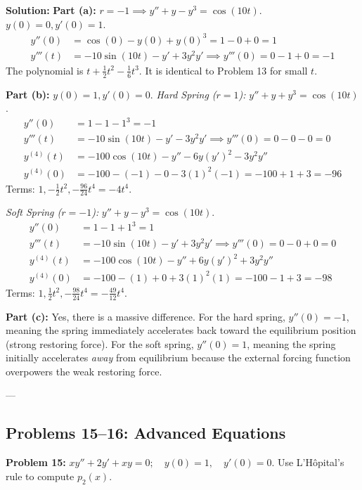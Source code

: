 \documentclass[11pt, letterpaper]{article}
\theoremstyle{definition}
\theoremstyle{remark}
\begin{document}
\textbf{Solution:}
\textbf{Part (a):} $r = -1 \implies y'' + y - y^3 = \cos(10t)$. $y(0)=0, y'(0)=1$.
\begin{align*}
    y''(0) &= \cos(0) - y(0) + y(0)^3 = 1 - 0 + 0 = 1 \\
    y'''(t) &= -10\sin(10t) - y' + 3y^2 y' \implies y'''(0) = 0 - 1 + 0 = -1
\end{align*}
The polynomial is $t + \frac{1}{2}t^2 - \frac{1}{6}t^3$. It is identical to Problem 13 for small $t$.

\textbf{Part (b):} $y(0)=1, y'(0)=0$.
\textit{Hard Spring ($r=1$):} $y'' + y + y^3 = \cos(10t)$.
\begin{align*}
    y''(0) &= 1 - 1 - 1^3 = -1 \\
    y'''(t) &= -10\sin(10t) - y' - 3y^2 y' \implies y'''(0) = 0 - 0 - 0 = 0 \\
    y^{(4)}(t) &= -100\cos(10t) - y'' - 6y(y')^2 - 3y^2 y'' \\
    y^{(4)}(0) &= -100 - (-1) - 0 - 3(1)^2(-1) = -100 + 1 + 3 = -96
\end{align*}
Terms: $1, -\frac{1}{2}t^2, -\frac{96}{24}t^4 = -4t^4$.

\textit{Soft Spring ($r=-1$):} $y'' + y - y^3 = \cos(10t)$.
\begin{align*}
    y''(0) &= 1 - 1 + 1^3 = 1 \\
    y'''(t) &= -10\sin(10t) - y' + 3y^2 y' \implies y'''(0) = 0 - 0 + 0 = 0 \\
    y^{(4)}(t) &= -100\cos(10t) - y'' + 6y(y')^2 + 3y^2 y'' \\
    y^{(4)}(0) &= -100 - (1) + 0 + 3(1)^2(1) = -100 - 1 + 3 = -98
\end{align*}
Terms: $1, \frac{1}{2}t^2, -\frac{98}{24}t^4 = -\frac{49}{12}t^4$.

\textbf{Part (c):} Yes, there is a massive difference. For the hard spring, $y''(0) = -1$, meaning the spring immediately accelerates back toward the equilibrium position (strong restoring force). For the soft spring, $y''(0) = 1$, meaning the spring initially accelerates \textit{away} from equilibrium because the external forcing function overpowers the weak restoring force.

---

\subsection{Problems 15--16: Advanced Equations}

\textbf{Problem 15:} $xy'' + 2y' + xy = 0 ; \quad y(0) = 1 , \quad y'(0) = 0$. Use L'Hôpital's rule to compute $p_2(x)$.
\end{document}
